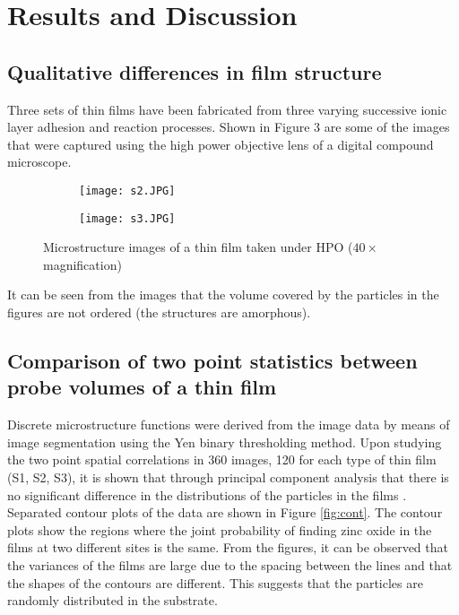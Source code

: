 \chapter{Results and Discussion}

\section{Qualitative differences in film structure}

Three sets of thin films have been fabricated from three varying successive ionic layer adhesion and reaction processes.
Shown in Figure 3 are some of the images that were captured using the high power objective lens of a digital compound microscope.

\begin{figure}
  \centering
  \begin{subfigure}{.4\textwidth}
    \centering
    \texttt{[image: s2.JPG]}
    \label{fig:dark}
  \end{subfigure}
  \begin{subfigure}{.4\textwidth}
    \centering
    \texttt{[image: s3.JPG]}
    \label{fig:light}
  \end{subfigure}
  \caption[HPO images of thin films]{Microstructure images of a thin film taken under HPO ($40\times$ magnification)}
  \label{fig:hpo}
\end{figure}

It can be seen from the images that the volume covered by the particles in the figures are not ordered (the structures are amorphous).

\section[Comparison of spatial correlations]{Comparison of two point statistics between probe volumes of a thin film}

Discrete microstructure functions were derived from the image data by means of image segmentation using the Yen binary thresholding method.
Upon studying the two point spatial correlations in 360 images, 120 for each type of thin film (S1, S2, S3), it is shown that through principal component analysis that there is no significant difference in the distributions of the particles in the films \cite{gupta15}.
Separated contour plots of the data are shown in Figure \ref{fig:cont}.
The contour plots show the regions where the joint probability of finding zinc oxide in the films at two different sites is the same.
From the figures, it can be observed that the variances of the films are large due to the spacing between the lines and that the shapes of the contours are different.
This suggests that the particles are randomly distributed in the substrate.


